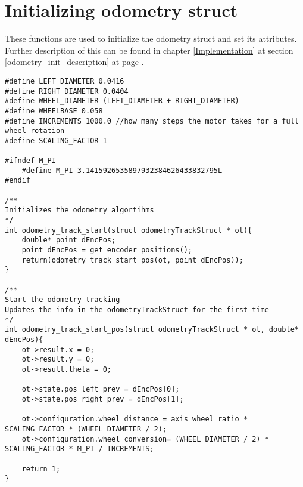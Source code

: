 \section{Initializing odometry struct}
\label{odometry_init_code}
These functions are used to initialize the odometry struct and set its attributes.
Further description of this can be found in chapter \ref{Implementation} at section \ref{odometry_init_description} at page \pageref{odometry_init_description}.
\begin{lstlisting}[caption = {Initializing odometry struct}]
#define LEFT_DIAMETER 0.0416
#define RIGHT_DIAMETER 0.0404
#define WHEEL_DIAMETER (LEFT_DIAMETER + RIGHT_DIAMETER)
#define WHEELBASE 0.058 
#define INCREMENTS 1000.0 //how many steps the motor takes for a full wheel rotation
#define SCALING_FACTOR 1 

#ifndef M_PI
	#define M_PI 3.1415926535897932384626433832795L
#endif

/**
Initializes the odometry algortihms
*/
int odometry_track_start(struct odometryTrackStruct * ot){
	double* point_dEncPos;
	point_dEncPos = get_encoder_positions();
	return(odometry_track_start_pos(ot, point_dEncPos));
}

/**
Start the odometry tracking
Updates the info in the odometryTrackStruct for the first time
*/
int odometry_track_start_pos(struct odometryTrackStruct * ot, double* dEncPos){
	ot->result.x = 0;
	ot->result.y = 0;
	ot->result.theta = 0;
	
	ot->state.pos_left_prev = dEncPos[0];
	ot->state.pos_right_prev = dEncPos[1];
	
	ot->configuration.wheel_distance = axis_wheel_ratio * SCALING_FACTOR * (WHEEL_DIAMETER / 2);
	ot->configuration.wheel_conversion= (WHEEL_DIAMETER / 2) * SCALING_FACTOR * M_PI / INCREMENTS;
	
	return 1;
}
\end{lstlisting}

